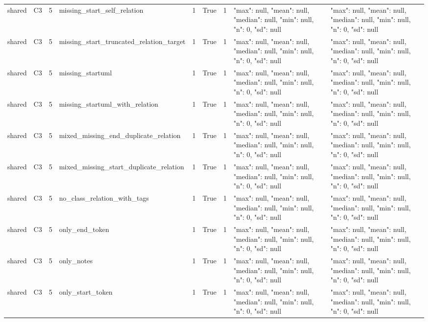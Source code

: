 \begin{tabular}{lllllllll}
shared & C3 & 5 & missing\_start\_self\_relation & 1 & True & 1 & {"max": null, "mean": null, "median": null, "min": null, "n": 0, "sd": null} & {"max": null, "mean": null, "median": null, "min": null, "n": 0, "sd": null} \\
shared & C3 & 5 & missing\_start\_truncated\_relation\_target & 1 & True & 1 & {"max": null, "mean": null, "median": null, "min": null, "n": 0, "sd": null} & {"max": null, "mean": null, "median": null, "min": null, "n": 0, "sd": null} \\
shared & C3 & 5 & missing\_startuml & 1 & True & 1 & {"max": null, "mean": null, "median": null, "min": null, "n": 0, "sd": null} & {"max": null, "mean": null, "median": null, "min": null, "n": 0, "sd": null} \\
shared & C3 & 5 & missing\_startuml\_with\_relation & 1 & True & 1 & {"max": null, "mean": null, "median": null, "min": null, "n": 0, "sd": null} & {"max": null, "mean": null, "median": null, "min": null, "n": 0, "sd": null} \\
shared & C3 & 5 & mixed\_missing\_end\_duplicate\_relation & 1 & True & 1 & {"max": null, "mean": null, "median": null, "min": null, "n": 0, "sd": null} & {"max": null, "mean": null, "median": null, "min": null, "n": 0, "sd": null} \\
shared & C3 & 5 & mixed\_missing\_start\_duplicate\_relation & 1 & True & 1 & {"max": null, "mean": null, "median": null, "min": null, "n": 0, "sd": null} & {"max": null, "mean": null, "median": null, "min": null, "n": 0, "sd": null} \\
shared & C3 & 5 & no\_class\_relation\_with\_tags & 1 & True & 1 & {"max": null, "mean": null, "median": null, "min": null, "n": 0, "sd": null} & {"max": null, "mean": null, "median": null, "min": null, "n": 0, "sd": null} \\
shared & C3 & 5 & only\_end\_token & 1 & True & 1 & {"max": null, "mean": null, "median": null, "min": null, "n": 0, "sd": null} & {"max": null, "mean": null, "median": null, "min": null, "n": 0, "sd": null} \\
shared & C3 & 5 & only\_notes & 1 & True & 1 & {"max": null, "mean": null, "median": null, "min": null, "n": 0, "sd": null} & {"max": null, "mean": null, "median": null, "min": null, "n": 0, "sd": null} \\
shared & C3 & 5 & only\_start\_token & 1 & True & 1 & {"max": null, "mean": null, "median": null, "min": null, "n": 0, "sd": null} & {"max": null, "mean": null, "median": null, "min": null, "n": 0, "sd": null} \\

\end{tabular}
